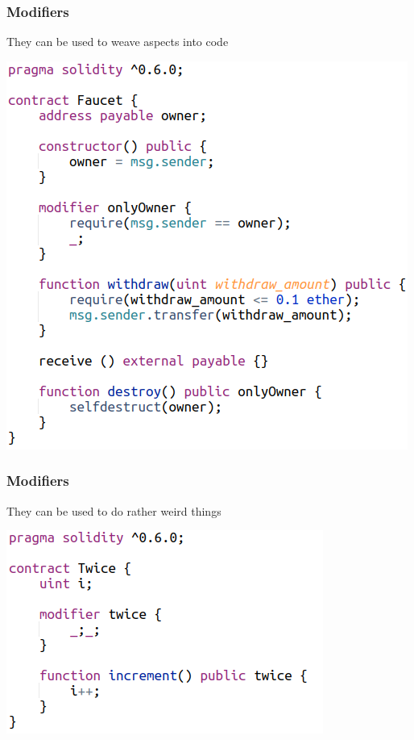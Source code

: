 \documentclass[11pt]{beamer}  %
\begin{document}
\begin{frame}\frametitle{Modifiers}

  \begin{greenbox}{They can be used to weave aspects into code}
    \begin{center}
      \includegraphics[scale=0.4,clip=false]{pictures/modifier.png}
    \end{center}
  \end{greenbox}

\end{frame}

\begin{frame}\frametitle{Modifiers}

  \begin{greenbox}{They can be used to do rather weird things}
    \begin{center}
      \includegraphics[scale=0.6,clip=false]{pictures/twice.png}
    \end{center}
  \end{greenbox}

\end{frame}
\end{document}
